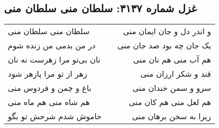 \begin{center}
\section*{غزل شماره ۳۱۳۷: سلطان منی سلطان منی}
\label{sec:3137}
\begin{longtable}{l p{0.5cm} r}
سلطان منی سلطان منی
&&
و اندر دل و جان ایمان منی
\\
در من بدمی من زنده شوم
&&
یک جان چه بود صد جان منی
\\
نان بی‌تو مرا زهرست نه نان
&&
هم آب منی هم نان منی
\\
زهر از تو مرا پازهر شود
&&
قند و شکر ارزان منی
\\
باغ و چمن و فردوس منی
&&
سرو و سمن خندان منی
\\
هم شاه منی هم ماه منی
&&
هم لعل منی هم کان منی
\\
خاموش شدم شرحش تو بگو
&&
زیرا به سخن برهان منی
\\
\end{longtable}
\end{center}
